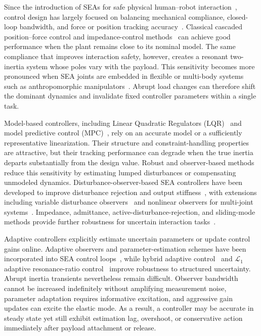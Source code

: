 \documentclass[letterpaper,journal]{IEEEtran}
\begin{document}
Since the introduction of SEAs for safe physical human--robot interaction~\cite{pratt1995Series,pratt1999Series}, control design has largely focused on balancing mechanical compliance, closed-loop bandwidth, and force or position tracking accuracy~\cite{calanca2016Review,paine2014Design}. Classical cascaded position--force control and impedance-control methods~\cite{hogan1985Impedance} can achieve good performance when the plant remains close to its nominal model. The same compliance that improves interaction safety, however, creates a resonant two-inertia system whose poles vary with the payload. This sensitivity becomes more pronounced when SEA joints are embedded in flexible or multi-body systems such as anthropomorphic manipulators~\cite{li2024Advances}. Abrupt load changes can therefore shift the dominant dynamics and invalidate fixed controller parameters within a single task.

Model-based controllers, including Linear Quadratic Regulators (LQR)~\cite{sariyildiz2026Robust} and model predictive control (MPC)~\cite{zhang2024Development}, rely on an accurate model or a sufficiently representative linearization. Their structure and constraint-handling properties are attractive, but their tracking performance can degrade when the true inertia departs substantially from the design value. Robust and observer-based methods reduce this sensitivity by estimating lumped disturbances or compensating unmodeled dynamics. Disturbance-observer-based SEA controllers have been developed to improve disturbance rejection and output stiffness~\cite{asignacion2021high,ito2024disturbance}, with extensions including variable disturbance observers~\cite{sun2025Variablea} and nonlinear observers for multi-joint systems~\cite{han2021nonlinear}. Impedance, admittance, active-disturbance-rejection, and sliding-mode methods provide further robustness for uncertain interaction tasks~\cite{lee2021hybrid,ozdemir2025adaptive,zhong2021toward,chen2021practical,sun2021trajectory}.

Adaptive controllers explicitly estimate uncertain parameters or update control gains online. Adaptive observers and parameter-estimation schemes have been incorporated into SEA control loops~\cite{song2025adaptive,min2026adaptive}, while hybrid adaptive control~\cite{lanh2023Hybrid} and $\mathcal{L}_1$ adaptive resonance-ratio control~\cite{min2024L1adaptive} improve robustness to structured uncertainty. Abrupt inertia transients nevertheless remain difficult. Observer bandwidth cannot be increased indefinitely without amplifying measurement noise, parameter adaptation requires informative excitation, and aggressive gain updates can excite the elastic mode. As a result, a controller may be accurate in steady state yet still exhibit estimation lag, overshoot, or conservative action immediately after payload attachment or release.
\end{document}
